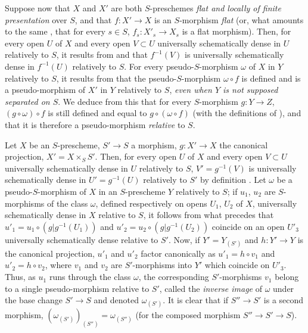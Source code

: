 \begin{env}[20.5.7]
\label{IV.20.5.7}
Suppose now that $X$ and $X'$ are both $S$-preschemes \emph{flat and locally of finite presentation} over $S$, and that $f:X'\to X$ is an $S$-morphism \emph{flat} (or, what amounts to the same , that for every $s\in S$, $f_s:X'_s\to X_s$ is a flat morphism).
Then, for every open $U$ of $X$ and every open $V\subset U$ universally schematically dense in $U$ relatively to $S$, it results from  and  that $f^{-1}(V)$ is universally schematically dense in $f^{-1}(U)$ relatively to $S$.
For every pseudo-$S$-morphism $\omega$ of $X$ in $Y$ relatively to $S$, it results from  that the pseudo-$S$-morphism $\omega\circ f$ is defined and is a pseudo-morphism of $X'$ in $Y$ relatively to $S$, \emph{even when $Y$ is not supposed separated on $S$}.
We deduce from this that for every $S$-morphism $g:Y\to Z$, $(g\circ\omega)\circ f$ is still defined and equal to $g\circ(\omega\circ f)$ (with the definitions of ), and that it is therefore a pseudo-morphism \emph{relative} to $S$.
\end{env}

\begin{env}[20.5.8]
\label{IV.20.5.8}
Let $X$ be an $S$-prescheme, $S'\to S$ a morphism, $g:X'\to X$ the canonical projection, $X'=X\times_S S'$.
Then, for every open $U$ of $X$ and every open $V\subset U$ universally schematically dense in $U$ relatively to $S$, $V'=g^{-1}(V)$ is universally schematically dense in $U'=g^{-1}(U)$ relatively to $S'$ by definition .
Let $\omega$ be a pseudo-$S$-morphism of $X$ in an $S$-prescheme $Y$ relatively to $S$;
if $u_1$, $u_2$ are $S$-morphisms of the class $\omega$, defined respectively on opens $U_1$, $U_2$ of $X$, universally schematically dense in $X$ relative to $S$, it follows from what precedes that $u'_1=u_1\circ(g|g^{-1}(U_1))$ and $u'_2=u_2\circ(g|g^{-1}(U_2))$ coincide on an open $U'_3$ universally schematically dense relative to $S'$.
Now, if $Y'=Y_{(S')}$ and $h:Y'\to Y$ is the canonical projection, $u'_1$ and $u'_2$ factor canonically as $u'_1=h\circ v_1$ and $u'_2=h\circ v_2$, where $v_1$ and $v_2$ are $S'$-morphisms into $Y'$ which coincide on $U'_3$.
Thus, as $u_1$ runs through the class $\omega$, the corresponding $S'$-morphisms $v_1$ belong to a single pseudo-morphism relative to $S'$, called the \emph{inverse image} of $\omega$ under the base change $S'\to S$ and denoted $\omega_{(S')}$.
It is clear that if $S''\to S'$ is a second morphism, $(\omega_{(S')})_{(S'')}=\omega_{(S'')}$ (for the composed morphism $S''\to S'\to S$).
\end{env}

